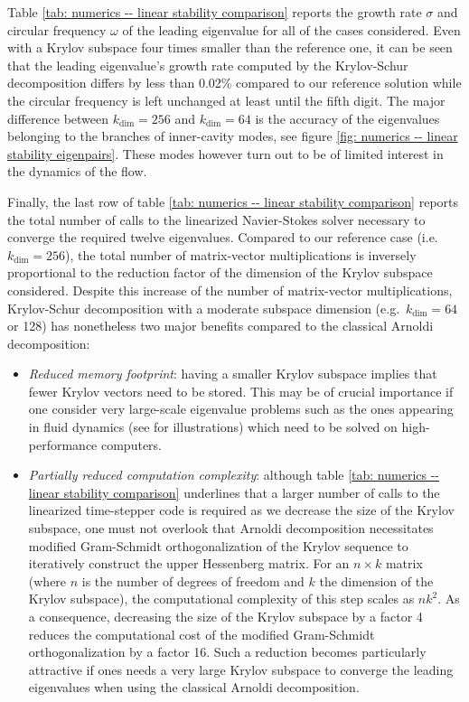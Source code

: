     Table \ref{tab: numerics -- linear stability comparison} reports the growth rate $\sigma$ and circular frequency $\omega$ of the leading eigenvalue for all of the cases considered. Even with a Krylov subspace four times smaller than the reference one, it can be seen that the leading eigenvalue's growth rate computed by the Krylov-Schur decomposition differs by less than 0.02\% compared to our reference solution while the circular frequency is left unchanged at least until the fifth digit. The major difference between $k_{\text{dim}} = 256$ and $k_{\text{dim}}=64$ is the accuracy of the eigenvalues belonging to the branches of inner-cavity modes, see figure \ref{fig: numerics -- linear stability eigenpairs}. These modes however turn out to be of limited interest in the dynamics of the flow.

    Finally, the last row of table \ref{tab: numerics -- linear stability comparison} reports the total number of calls to the linearized Navier-Stokes solver necessary to converge the required twelve eigenvalues. Compared to our reference case (i.e.\ $k_{\text{dim}}=256$), the total number of matrix-vector multiplications is inversely proportional to the reduction factor of the dimension of the Krylov subspace considered. Despite this increase of the number of matrix-vector multiplications, Krylov-Schur decomposition with a moderate subspace dimension (e.g.\ $k_{\text{dim}}=64$ or 128) has nonetheless two major benefits compared to the classical Arnoldi decomposition:
    \begin{itemize}
      \item \emph{Reduced memory footprint}: having a smaller Krylov subspace implies that fewer Krylov vectors need to be stored. This may be of crucial importance if one consider very large-scale eigenvalue problems such as the ones appearing in fluid dynamics (see \cite{jfm:ilak:2012, jfm:loiseau:2014, pof:citro:2015, jfm:bucci:2018} for illustrations) which need to be solved on high-performance computers.

      \item \emph{Partially reduced computation complexity}: although table \ref{tab: numerics -- linear stability comparison} underlines that a larger number of calls to the linearized time-stepper code is required as we decrease the size of the Krylov subspace, one must not overlook that Arnoldi decomposition necessitates modified Gram-Schmidt orthogonalization of the Krylov sequence to iteratively construct the upper Hessenberg matrix. For an $n \times k$ matrix (where $n$ is the number of degrees of freedom and $k$ the dimension of the Krylov subspace), the computational complexity of this step scales as $nk^2$. As a consequence, decreasing the size of the Krylov subspace by a factor 4 reduces the computational cost of the modified Gram-Schmidt orthogonalization by a factor 16. Such a reduction becomes particularly attractive if ones needs a very large Krylov subspace to converge the leading eigenvalues when using the classical Arnoldi decomposition.
    \end{itemize}
